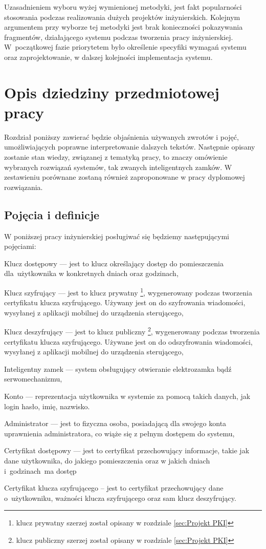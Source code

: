 \documentclass[twoside,10pt]{article}
\begin{document}
Uzasadnieniem wyboru wyżej wymienionej metodyki, jest fakt popularności stosowania podczas realizowania dużych projektów inżynierskich. Kolejnym argumentem przy wyborze tej metodyki jest brak konieczności pokazywania fragmentów, działającego systemu podczas tworzenia pracy inżynierskiej. W~początkowej fazie priorytetem było określenie specyfiki wymagań systemu oraz zaprojektowanie, w dalszej kolejności implementacja systemu\cite{waterfall}.

\newpage
\section{Opis dziedziny przedmiotowej pracy}\label{sec:dziedzina}
Rozdział poniższy zawierać będzie objaśnienia używanych zwrotów i pojęć, umożliwiających poprawne interpretowanie dalszych tekstów. Następnie opisany zostanie stan wiedzy, związanej z tematyką pracy, to znaczy omówienie wybranych rozwiązań systemów, tak zwanych inteligentnych zamków. W zestawieniu porównane zostaną również zaproponowane w pracy dyplomowej rozwiązania.
\subsection{Pojęcia i definicje}\label{sec:Pojęcia i definicje}
W poniższej pracy inżynierskiej posługiwać się będziemy następującymi pojęciami:
\begin{itemize*}
\item {Klucz dostępowy} --- jest to  klucz określający dostęp do pomieszczenia dla~użytkownika w konkretnych dniach oraz godzinach,
\item {Klucz szyfrujący} 
--- jest to klucz prywatny \footnote{ klucz prywatny szerzej został opisany w rozdziale \ref{sec:Projekt PKI}}, wygenerowany podczas tworzenia certyfikatu klucza szyfrującego. Używany jest on do szyfrowania wiadomości, wysyłanej z aplikacji mobilnej do urządzenia sterującego,
\item {Klucz deszyfrujący }
--- jest to klucz publiczny \footnote{ klucz publiczny szerzej został opisany w rozdziale \ref{sec:Projekt PKI}}, wygenerowany podczas tworzenia certyfikatu klucza szyfrującego. Używane jest on do odszyfrowania wiadomości, wysyłanej z aplikacji mobilnej do urządzenia sterującego,
\item {Inteligentny zamek}
--- system obsługujący otwieranie elektrozamka bądź serwomechanizmu,
\item {Konto}
--- reprezentacja użytkownika w systemie za pomocą takich danych, jak login hasło, imię, nazwisko.
\item {Administrator}
--- jest to fizyczna osoba, posiadającą dla swojego konta uprawnienia administratora, co wiąże się z pełnym dostępem do systemu,
\item {Certyfikat dostępowy}
--- jest to certyfikat przechowujący informacje, takie jak dane użytkownika, do jakiego pomieszczenia oraz w jakich dniach i~godzinach~ma dostęp
\item {Certyfikat klucza szyfrującego}
-- jest to certyfikat przechowujący dane o~użytkowniku, ważności klucza szyfrującego oraz sam klucz deszyfrujący.
\end{itemize*}
\end{document}
